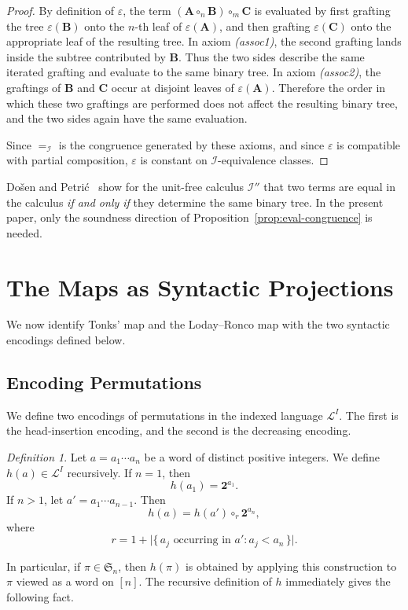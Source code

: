 \documentclass[a4paper]{article}
\theoremstyle{plain}
\theoremstyle{definition}
\theoremstyle{remark}
\numberwithin{equation}{section}
\newcommand{\Sym}{\mathfrak{S}}
\newcommand{\eval}{\varepsilon}
\newtheorem{definition}[theorem]{Definition}
\begin{document}
\begin{proof}
By definition of \(\eval\), the term
\((\mathbf A\circ_n \mathbf B)\circ_m \mathbf C\) is evaluated by first
grafting the tree \(\eval(\mathbf B)\) onto the \(n\)-th leaf of
\(\eval(\mathbf A)\), and then grafting \(\eval(\mathbf C)\) onto the
appropriate leaf of the resulting tree. In axiom \emph{(assoc1)}, the second grafting lands inside the subtree
contributed by \(\mathbf B\). Thus the two sides describe the same iterated
grafting and evaluate to the same binary tree. In axiom \emph{(assoc2)}, the graftings of \(\mathbf B\) and \(\mathbf C\)
occur at disjoint leaves of \(\eval(\mathbf A)\). Therefore the order in which
these two graftings are performed does not affect the resulting binary tree,
and the two sides again have the same evaluation.

Since \(=_{\mathcal I}\) is the congruence generated by these axioms, and since
\(\eval\) is compatible with partial composition, \(\eval\) is constant on
\(\mathcal I\)-equivalence classes.
\end{proof}

Do\v{s}en and Petri\'c~\cite{DP1} show for the unit-free calculus \(\mathcal I''\) that two terms are equal in the calculus \emph{if and only if} they determine the same binary tree. In the present paper, only the soundness direction of Proposition~\ref{prop:eval-congruence} is needed.


\section{The Maps as Syntactic Projections}

We now identify Tonks' map and the Loday--Ronco map with the two syntactic
encodings defined below.

\subsection{Encoding Permutations}

We define two encodings of permutations in the indexed language \(\mathcal L^I\). The first is the head-insertion encoding, and the second is the decreasing encoding.

\begin{definition}\label{def:head-insertion}
Let \(a=a_1\cdots a_n\) be a word of distinct positive integers. We define
\(h(a)\in\mathcal L^I\) recursively. If \(n=1\), then
    \[
    h(a_1)=\mathbf 2^{a_1}.
    \]
If $n>1$, let \(a'=a_1\cdots a_{n-1}\). Then
    \[
    h(a)=h(a')\circ_r \mathbf 2^{a_n},
    \]
    where
    \[
    r=1+\bigl|\{\,a_j \text{ occurring in } a' : a_j<a_n\,\}\bigr|.
    \]
\end{definition} 
In particular, if \(\pi\in\Sym_n\), then \(h(\pi)\) is obtained by applying this
construction to \(\pi\) viewed as a word on $[n]$. The recursive definition of \(h\) immediately gives the following fact.
\end{document}
